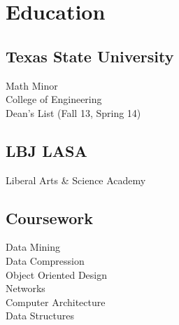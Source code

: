 \documentclass[letterpaper]{resume} %
\begin{document}
\begin{minipage}[t]{0.33\textwidth} %


\section{Education} 

\subsection{Texas State University}
Math Minor \\
College of Engineering \\
Dean's List (Fall 13, Spring 14) \\

\sectionspace %


\subsection{LBJ LASA}
Liberal Arts \& Science Academy \\

\sectionspace %


\subsection{Coursework}

Data Mining \\
Data Compression \\
Object Oriented Design \\
Networks \\
Computer Architecture \\
Data Structures

\sectionspace %



\end{minipage}
\end{document}
